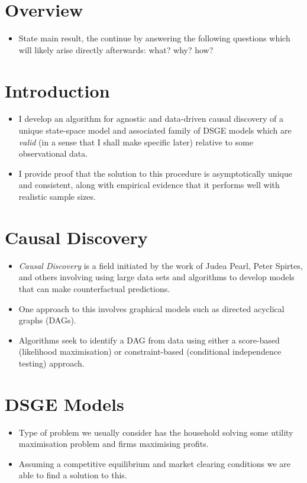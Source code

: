 \documentclass{article}
\begin{document}
\section*{Overview}
\begin{itemize}
    \item State main result, the continue by answering the following questions which will likely arise directly afterwards: what? why? how?
\end{itemize}

\section*{Introduction}
\begin{itemize}
    \item I develop an algorithm for agnostic and data-driven causal discovery of a unique state-space model and associated family of DSGE models which are \textit{valid} (in a sense that I shall make specific later) relative to some observational data.
    \item I provide proof that the solution to this procedure is asymptotically unique and consistent, along with empirical evidence that it performs well with realistic sample sizes.
\end{itemize}

\section*{Causal Discovery}
\begin{itemize}
    \item \textit{Causal Discovery} is a field initiated by the work of Judea Pearl, Peter Spirtes, and others involving using large data sets and algorithms to develop models that can make counterfactual predictions.
    \item One approach to this involves graphical models such as directed acyclical graphs (DAGs).
    \item Algorithms seek to identify a DAG from data using either a score-based (likelihood maximisation) or constraint-based (conditional independence testing) approach.
\end{itemize}

\section*{DSGE Models}
\begin{itemize}
    \item Type of problem we usually consider has the household solving some utility maximisation problem and firms maximising profits.
    \item Assuming a competitive equilibrium and market clearing conditions we are able to find a solution to this. 
\end{itemize}
\end{document}
